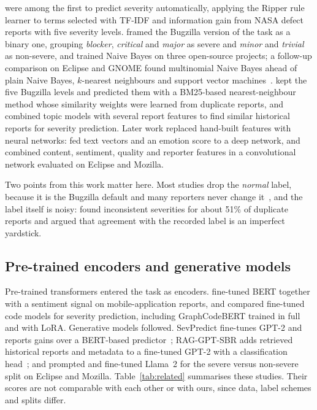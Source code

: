 \documentclass[a4paper,fleqn]{cas-sc}
\begin{document}
\citet{menzies2008automated} were among the first to predict severity automatically,
applying the Ripper rule learner to terms selected with TF-IDF and information gain from
NASA defect reports with five severity levels. \citet{lamkanfi2010predicting} framed the
Bugzilla version of the task as a binary one, grouping \textit{blocker},
\textit{critical} and \textit{major} as severe and \textit{minor} and \textit{trivial}
as non-severe, and trained Naive Bayes on three open-source projects; a follow-up
comparison on Eclipse and GNOME found multinomial Naive Bayes ahead of plain Naive
Bayes, $k$-nearest neighbours and support vector machines~\citep{lamkanfi2011comparing}.
\citet{tian2012information} kept the five Bugzilla levels and predicted them with a
BM25-based nearest-neighbour method whose similarity weights were learned from
duplicate reports, and \citet{yang2014towards} combined topic models with several report
features to find similar historical reports for severity prediction. Later work
replaced hand-built features with neural networks: \citet{ramay2019deep} fed text
vectors and an emotion score to a deep network, and \citet{dao2021severity} combined
content, sentiment, quality and reporter features in a convolutional network evaluated
on Eclipse and Mozilla.

Two points from this work matter here. Most studies drop the
\textit{normal} label, because it is the Bugzilla default and many reporters never
change it~\citep{oliveira2024predictive}, and the label itself is noisy:
\citet{tian2016unreliability} found inconsistent severities for about 51\% of duplicate
reports and argued that agreement with the recorded label is an imperfect yardstick.

\subsection{Pre-trained encoders and generative models}

Pre-trained transformers entered the task as encoders. \citet{ali2024bert} fine-tuned
BERT together with a sentiment signal on mobile-application reports, and
\citet{agarwal2026finetuning} compared fine-tuned code models for severity prediction,
including GraphCodeBERT trained in full and with LoRA. Generative models followed. SevPredict fine-tunes
GPT-2 and reports gains over a BERT-based predictor~\citep{arshad2024sevpredict};
RAG-GPT-SBR adds retrieved historical reports and metadata to a fine-tuned GPT-2 with a
classification head~\citep{ali2025retrieval}; and \citet{oliveira2024predictive}
prompted and fine-tuned Llama~2 for the severe versus non-severe split on Eclipse and
Mozilla. Table~\ref{tab:related} summarises these studies. Their scores are not
comparable with each other or with ours, since data, label schemes and splits differ.
\end{document}
